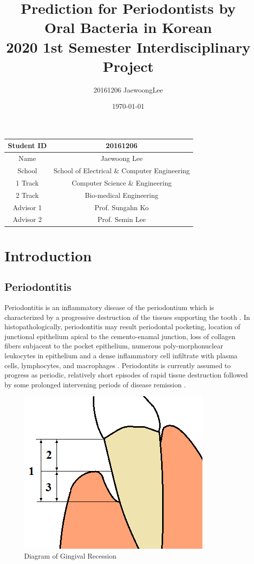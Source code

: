 \documentclass[aps, 11pt, a4paper]{article}
\title{Prediction for Periodontists by Oral Bacteria in Korean\\ \large 2020 1st Semester Interdisciplinary Project}
\author{20161206 JaewoongLee}
\date{\today}
\begin{document}
    \maketitle
    \begin{table}[h]
    	\centering
		\begin{tabular}{c|c}
			Student ID & 20161206 \\ \hline
			Name & Jaewoong Lee \\ \hline
			School & School of Electrical \& Computer Engineering \\ \hline
			1 Track & Computer Science \& Engineering \\ \hline
			2 Track & Bio-medical Engineering \\ \hline
			Advisor 1 & Prof. Sungahn Ko \\ \hline
			Advisor 2 & Prof. Semin Lee \\
		\end{tabular}
    \end{table}
    \newpage
    
    \tableofcontents
    \listoftables
    \listoffigures
    \newpage
    
    \section{Introduction}
    	\subsection{Periodontitis}
    		Periodontitis is an inflammatory disease of the periodontium which is characterized by a progressive destruction of the tissues supporting the tooth \cite{ref:perio2}. In histopathologically, periodontitis may result periodontal pocketing, location of junctional epithelium apical to the cemento-enamal junction, loss of collagen fibers subjacent to the pocket epithelium, numerous poly-morphonuclear leukocytes in epithelium and a dense inflammatory cell infiltrate with plasma cells, lymphocytes, and macrophages \cite{ref:perio1}. Periodontits is currently assumed to progress as periodic, relatively short episodes of rapid tissue destruction followed by some prolonged intervening periods of disease remission \cite{ref:perio2}. 
    		
    		\begin{figure}[htbp]
    			\centering
    			\includegraphics[width=0.3 \linewidth]{figures/recession.png}
    			\caption{Diagram of Gingival Recession \protect \cite{ref:depth1}}
    			\label{fig:depth}
    		\end{figure}
    	
\end{document}
